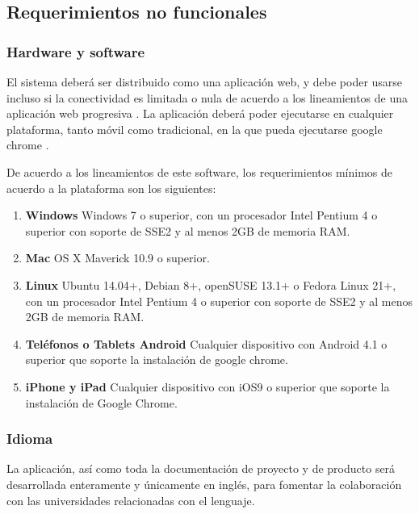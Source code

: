 \documentclass[a4paper,11pt]{article}
\begin{document}
\subsection{Requerimientos no funcionales}

\subsubsection{Hardware y software}

El sistema deberá ser distribuido como una aplicación web, y debe poder usarse
incluso si la conectividad es limitada o nula de acuerdo a los lineamientos de
una aplicación web progresiva \cite{pwa}. La aplicación deberá poder ejecutarse
en cualquier plataforma, tanto móvil como tradicional, en la que pueda
ejecutarse google chrome \cite{chrome}.

De acuerdo a los lineamientos de este software, los requerimientos mínimos de
acuerdo a la plataforma son los siguientes:

\begin{enumerate}

  \item \textbf{Windows} Windows 7 o superior, con un procesador Intel Pentium
    4 o superior con soporte de SSE2 y al menos 2GB de memoria RAM.

  \item \textbf{Mac} OS X Maverick 10.9 o superior.

  \item \textbf{Linux} Ubuntu 14.04+, Debian 8+, openSUSE 13.1+ o Fedora Linux
    21+, con un procesador Intel Pentium 4 o superior con soporte de SSE2 y al
    menos 2GB de memoria RAM.

  \item \textbf{Teléfonos o Tablets Android} Cualquier dispositivo con Android
    4.1 o superior que soporte la instalación de google chrome.

  \item \textbf{iPhone y iPad} Cualquier dispositivo con iOS9 o superior que
    soporte la instalación de Google Chrome.

\end{enumerate}

\subsubsection{Idioma}

La aplicación, así como toda la documentación de proyecto y de producto será
desarrollada enteramente y únicamente en inglés, para fomentar la colaboración
con las universidades relacionadas con el lenguaje.
\end{document}
